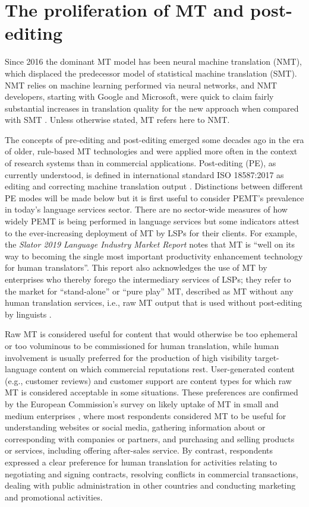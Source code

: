 \documentclass[output=paper,colorlinks,citecolor=brown]{langsci/langscibook}
\begin{document}
\section{The proliferation of MT and post-editing}

Since 2016 the dominant MT model has been neural machine translation (NMT), which displaced the predecessor model of statistical machine translation (SMT). NMT relies on machine learning performed via neural networks, and NMT developers, starting with Google and Microsoft, were quick to claim fairly substantial increases in translation quality for the new approach when compared with SMT \citep{wu_googles_2016}. Unless otherwise stated, MT refers here to NMT.

The concepts of pre-editing and post-editing emerged some decades ago in the era of older, rule-based MT technologies and were applied more often in the context of research systems than in commercial applications. Post-editing (PE), as currently understood, is defined in international standard ISO 18587:2017 as editing and correcting machine translation output \citep{british_standards_institution_iso_2017}. Distinctions between different PE modes will be made below but it is first useful to consider PEMT’s prevalence in today’s language services sector. There are no sector-wide measures of how widely PEMT is being performed in language services but some indicators attest to the ever-increasing deployment of MT by LSPs for their clients. For example, the \textit{Slator 2019 Language Industry Market Report} \citep[16]{faes_slator_2019} notes that MT is \enquote{well on its way to becoming the single most important productivity enhancement technology for human translators}. This report also acknowledges the use of MT by enterprises who thereby forego the intermediary services of LSPs; they refer to the market for \enquote{stand-alone} or \enquote{pure play} MT, described as MT without any human translation services, i.e., raw MT output that is used without post-editing by linguists \citep[16]{faes_slator_2019}.

Raw MT is considered useful for content that would otherwise be too ephem\-er\-al or too voluminous to be commissioned for human translation, while human involvement is usually preferred for the production of high visibility target-language content on which commercial reputations rest. User-generated content (e.g., customer reviews) and customer support are content types for which raw MT is considered acceptable in some situations. These preferences are confirmed by the European Commission’s survey on likely uptake of MT in small and medium enterprises \citep{directorate-general_for_communications_networks_content_and_technology_sme_2020}, where most respondents considered MT to be useful for understanding websites or social media, gathering information about or corresponding with companies or partners, and purchasing and selling products or services, including offering after-sales service. By contrast, respondents expressed a clear preference for human translation for activities relating to negotiating and signing contracts, resolving conflicts in commercial transactions, dealing with public administration in other countries and conducting marketing and promotional activities.
\end{document}
